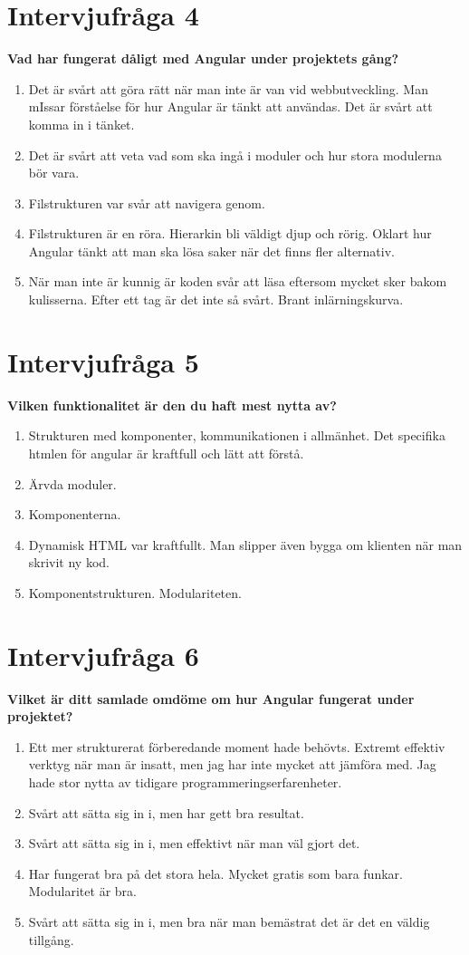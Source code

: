 \section{Intervjufråga 4}
\textbf{Vad har fungerat dåligt med Angular under projektets gång?}
\begin{enumerate}
\item Det är svårt att göra rätt när man inte är van vid webbutveckling. Man mIssar förståelse för hur Angular är tänkt att användas. Det är svårt att komma in i tänket.
\item Det är svårt att veta vad som ska ingå i moduler och hur stora modulerna bör vara.
\item Filstrukturen var svår att navigera genom.
\item Filstrukturen är en röra. Hierarkin bli väldigt djup och rörig. Oklart hur Angular tänkt att man ska lösa saker när det finns fler alternativ.
\item När man inte är kunnig är koden svår att läsa eftersom mycket sker bakom kulisserna. Efter ett tag är det inte så svårt. Brant inlärningskurva.
\end{enumerate}

\section{Intervjufråga 5}
\textbf{Vilken funktionalitet är den du haft mest nytta av?}
\begin{enumerate}
\item Strukturen med komponenter, kommunikationen i allmänhet. Det specifika htmlen för angular är kraftfull och lätt att förstå.
\item Ärvda moduler.
\item Komponenterna.
\item Dynamisk HTML var kraftfullt. Man slipper även bygga om klienten när man skrivit ny kod.
\item Komponentstrukturen. Modulariteten.
\end{enumerate}

\section{Intervjufråga 6}
\textbf{Vilket är ditt samlade omdöme om hur Angular fungerat under projektet?}
\begin{enumerate}
\item Ett mer strukturerat förberedande moment hade behövts. Extremt effektiv verktyg när man är insatt, men jag har inte mycket att jämföra med. Jag hade stor nytta av tidigare programmeringserfarenheter.
\item Svårt att sätta sig in i, men har gett bra resultat.
\item Svårt att sätta sig in i, men effektivt när man väl gjort det.
\item Har fungerat bra på det stora hela. Mycket gratis som bara funkar. Modularitet är bra.
\item Svårt att sätta sig in i, men bra när man bemästrat det är det en väldig tillgång.
\end{enumerate}

